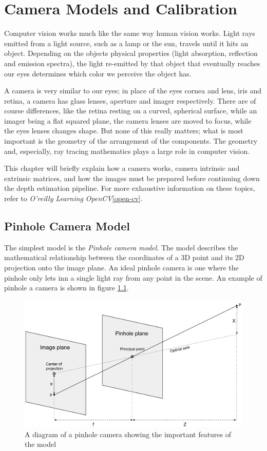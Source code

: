 \chapter{Camera Models and Calibration}

Computer vision works much like the same way human vision works. Light rays
emitted from a light source, such as a lamp or the sun, travels until it hits
an object. Depending on the objects physical properties (light absorption,
reflection and emission spectra), the light re-emitted by that object that
eventually reaches our eyes determines which color we perceive the object has.

A camera is very similar to our eyes; in place of the eyes cornea and lens,
iris and retina, a camera has glass lenses, aperture and imager respectively.
There are of course differences, like the retina resting on a curved,
spherical surface, while an imager being a flat squared plane, the camera
lenses are moved to focus, while the eyes lenses changes shape. But none of
this really matters; what is most important is the geometry of the arrangement
of the components. The geometry and, especially, ray tracing mathematics plays
a large role in computer vision.

This chapter will briefly explain how a camera works, camera intrinsic and
extrinsic matrices, and how the images must be prepared before continuing down
the depth estimation pipeline. For more exhaustive information on these
topics, refer to \emph{O'reilly Learning OpenCV}\ref{open-cv}.

\section{Pinhole Camera Model}

The simplest model is the \textit{Pinhole camera model}. The model describes
the mathematical relationship between the coordinates of a 3D point and its 2D
projection onto the image plane. An ideal pinhole camera is one where the
pinhole only lets inn a single light ray from any point in the scene.  An
example of pinhole a camera is shown in figure \ref{fig:pinhole-camera-model}.

\begin{figure}[h]
  \centering
  \label{fig:pinhole-camera-model}
  \includegraphics[width=\textwidth]{images/Pinhole-camera-model.pdf}
  \caption{A diagram of a pinhole camera showing the important features of the model}
\end{figure}

